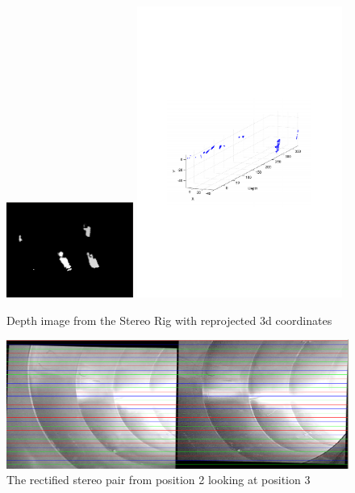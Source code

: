 \begin{figure}[htbp]
    \centering
    \includegraphics[width=0.37\textwidth]{pics/pos21-control-depth}
    \includegraphics[width=0.6\textwidth]{pics/pos21-control-3d}
    \caption{Depth image from the Stereo Rig with reprojected 3d coordinates}
    \label{chap7:fig-pos21-control-depth}
\end{figure}
\begin{figure}[htbp]
    \centering
    \includegraphics[width=\textwidth]{pics/pos21-control-rectified}
    \caption{The rectified stereo pair from position 2 looking at position 3 }
    \label{chap7:fig-pos21-control-rectified}
\end{figure}






